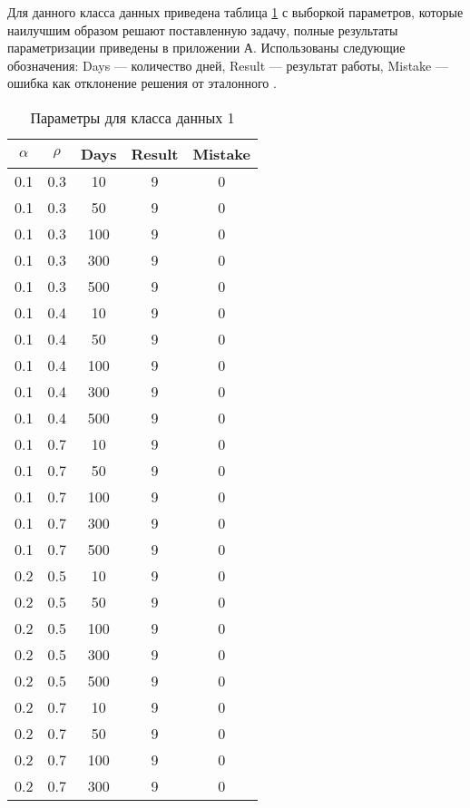 Для данного класса данных приведена таблица \ref{tbl:table_kd1}	с выборкой параметров, которые наилучшим образом решают поставленную задачу, полные результаты параметризации приведены в приложении А. Использованы следующие обозначения: Days --- количество дней, Result --- результат работы, Mistake --- ошибка как отклонение решения от эталонного .

\begin{center}
	\captionsetup{justification=raggedright,singlelinecheck=off}
	\begin{longtable}[c]{|c|c|c|c|c|}
		\caption{Параметры для класса данных 1\label{tbl:table_kd1}}\\ \hline
		$\alpha$ & $\rho$ & Days & Result & Mistake \\ \hline
		0.1 & 0.3 &  10 &    9 &    0 \\
		0.1 & 0.3 &  50 &    9 &    0 \\
		0.1 & 0.3 & 100 &    9 &    0 \\
		0.1 & 0.3 & 300 &    9 &    0 \\
		0.1 & 0.3 & 500 &    9 &    0 \\ \hline
		0.1 & 0.4 &  10 &    9 &    0 \\
		0.1 & 0.4 &  50 &    9 &    0 \\
		0.1 & 0.4 & 100 &    9 &    0 \\
		0.1 & 0.4 & 300 &    9 &    0 \\
		0.1 & 0.4 & 500 &    9 &    0 \\ \hline
		0.1 & 0.7 &  10 &    9 &    0 \\
		0.1 & 0.7 &  50 &    9 &    0 \\
		0.1 & 0.7 & 100 &    9 &    0 \\
		0.1 & 0.7 & 300 &    9 &    0 \\
		0.1 & 0.7 & 500 &    9 &    0 \\ \hline
		0.2 & 0.5 &  10 &    9 &    0 \\
		0.2 & 0.5 &  50 &    9 &    0 \\
		0.2 & 0.5 & 100 &    9 &    0 \\
		0.2 & 0.5 & 300 &    9 &    0 \\
		0.2 & 0.5 & 500 &    9 &    0 \\ \hline
		0.2 & 0.7 &  10 &    9 &    0 \\
		0.2 & 0.7 &  50 &    9 &    0 \\
		0.2 & 0.7 & 100 &    9 &    0 \\
		0.2 & 0.7 & 300 &    9 &    0 \\

\end{longtable}
\end{center}

